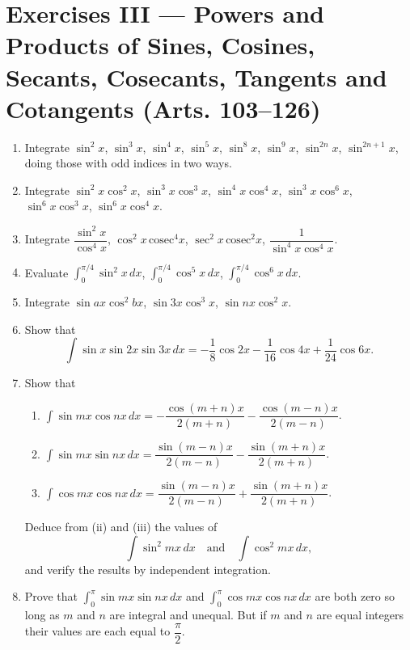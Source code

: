\documentclass[11pt, a4paper]{article}
\begin{document}
\section*{Exercises III --- Powers and Products of Sines, Cosines, Secants, Cosecants, Tangents and Cotangents (Arts. 103--126)}

\begin{enumerate}[leftmargin=2em]

\item Integrate $\sin^2x$, $\sin^3x$, $\sin^4x$, $\sin^5x$, $\sin^8x$, $\sin^9x$, $\sin^{2n}x$, $\sin^{2n+1}x$, doing those with odd indices in two ways.

\item Integrate $\sin^2x\cos^2x$, $\sin^3x\cos^3x$, $\sin^4x\cos^4x$, $\sin^3x\cos^6x$, $\sin^6x\cos^3x$, $\sin^6x\cos^4x$.

\item Integrate $\dfrac{\sin^2x}{\cos^4x}$, $\cos^2x\,\text{cosec}^4x$, $\sec^2x\,\text{cosec}^2x$, $\dfrac{1}{\sin^4x\cos^4x}$.

\item Evaluate $\displaystyle\int_0^{\pi/4}\sin^2x\,dx$, $\displaystyle\int_0^{\pi/4}\cos^5x\,dx$, $\displaystyle\int_0^{\pi/4}\cos^6x\,dx$.

\item Integrate $\sin ax\cos^2bx$, $\sin 3x\cos^3x$, $\sin nx\cos^2x$.

\item Show that
\[
\int \sin x\sin 2x\sin 3x\,dx = -\dfrac{1}{8}\cos 2x-\dfrac{1}{16}\cos 4x+\dfrac{1}{24}\cos 6x.
\]

\item Show that
\begin{enumerate}[label=(\roman*)]
\item $\displaystyle\int \sin mx\cos nx\,dx = -\dfrac{\cos(m+n)x}{2(m+n)}-\dfrac{\cos(m-n)x}{2(m-n)}$.
\item $\displaystyle\int \sin mx\sin nx\,dx = \dfrac{\sin(m-n)x}{2(m-n)}-\dfrac{\sin(m+n)x}{2(m+n)}$.
\item $\displaystyle\int \cos mx\cos nx\,dx = \dfrac{\sin(m-n)x}{2(m-n)}+\dfrac{\sin(m+n)x}{2(m+n)}$.
\end{enumerate}
Deduce from (ii) and (iii) the values of
\[
\int \sin^2mx\,dx \quad\text{and}\quad \int \cos^2mx\,dx,
\]
and verify the results by independent integration.

\item Prove that $\displaystyle\int_0^\pi \sin mx\sin nx\,dx$ and $\displaystyle\int_0^\pi \cos mx\cos nx\,dx$ are both zero so long as $m$ and $n$ are integral and unequal. But if $m$ and $n$ are equal integers their values are each equal to $\dfrac{\pi}{2}$.

\end{enumerate}
\end{document}

